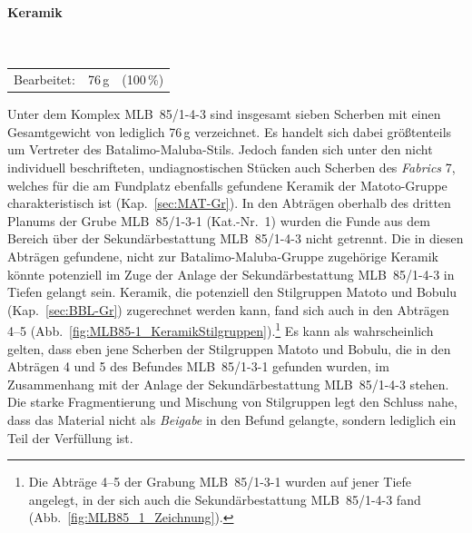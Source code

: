 \paragraph{Keramik\vspace{.5em}}\mbox{}\\
\begin{tabular}{@{}lrl@{}}
	Bearbeitet:	& 76\,g & (100\,\%) \\ 
\end{tabular} 

\vspace{1em}
\noindent Unter dem Komplex MLB~85/1-4-3 sind insgesamt sieben Scherben mit einen Gesamtgewicht von lediglich 76\,g verzeichnet. Es handelt sich dabei größtenteils um Vertreter des Batalimo-Maluba-Stils. Jedoch fanden sich unter den nicht individuell beschrifteten, undiagnostischen Stücken auch Scherben des \textit{Fabrics} 7, welches für die am Fundplatz ebenfalls gefundene Keramik der Matoto-Gruppe charakteristisch ist (Kap.~\ref{sec:MAT-Gr}). In den Abträgen oberhalb des dritten Planums der Grube MLB~85/1-3-1 (Kat.-Nr.~1) wurden die Funde aus dem Bereich über der Sekundärbestattung MLB~85/1-4-3 nicht getrennt. Die in diesen Abträgen gefundene, nicht zur Batalimo-Maluba-Gruppe zugehörige Keramik könnte potenziell im Zuge der Anlage der Sekundärbestattung MLB~85/1-4-3 in Tiefen gelangt sein. Keramik, die potenziell den Stilgruppen Matoto und Bobulu (Kap.~\ref{sec:BBL-Gr}) zugerechnet werden kann, fand sich auch in den Abträgen 4--5 (Abb.~\ref{fig:MLB85-1_KeramikStilgruppen}).\footnote{Die Abträge 4--5 der Grabung MLB~85/1-3-1 wurden auf jener Tiefe angelegt, in der sich auch die Sekundärbestattung MLB~85/1-4-3 fand (Abb.~\ref{fig:MLB85_1_Zeichnung}).} Es kann als wahrscheinlich gelten, dass eben jene Scherben der Stilgruppen Matoto und Bobulu, die in den Abträgen 4 und 5 des Befundes MLB~85/1-3-1 gefunden wurden, im Zusammenhang mit der Anlage der Sekundärbestattung MLB~85/1-4-3 stehen. Die starke Fragmentierung und Mischung von Stilgruppen legt den Schluss nahe, dass das Material nicht als \textit{Beigabe} in den Befund gelangte, sondern lediglich ein Teil der Verfüllung ist.

